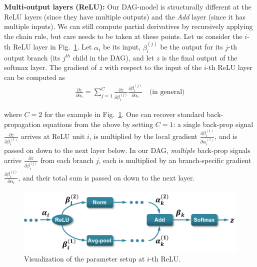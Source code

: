 \documentclass[10pt,twocolumn,letterpaper]{article}
\begin{document}
{\bf Multi-output layers (ReLU):} Our DAG-model is structurally different at the ReLU layers (since they have multiple outputs) and the \textit{Add} layer (since it has multiple inputs). We can still compute partial derivatives by recursively applying the chain rule, but care needs to be taken at these points. Let us consider the $i$-th ReLU layer in Fig.~\ref{fig:backprop_eq}. Let $\alpha_i$ be its input, $\beta_i^{(j)}$ be the output for its $j$-th output branch (its $j^{th}$ child in the DAG), and let $z$ is the final output of the softmax layer. The gradient of $z$ with respect to the input of the $i$-th ReLU layer can be computed as
\vspace{-5}
\begin{align}
\frac{\partial z}{\partial \alpha_i}=\sum_{j=1}^{C}\frac{\partial z}{\partial \beta_i^{(j)}}\frac{\partial \beta_i^{(j)}}{\partial \alpha_i} \quad \text {(in general)} \label{eq:backprop1}
\end{align}

\noindent where $C=2$ for the example in Fig.~\ref{fig:backprop_eq}. One can recover standard back-propagation equations from the above by setting $C=1$: a single back-prop signal $\frac{\partial z}{\partial \beta_i^{(1)}}$  arrives at ReLU unit $i$, is multiplied by the local gradient $\frac{\partial \beta_i^{(1)}}{\partial \alpha_i^{(1)}}$, and is passed on down to the next layer below. In our DAG, {\em multiple} back-prop signals arrive $\frac{\partial z}{\partial \beta_i^{(j)}}$ from each branch $j$, each is multiplied by an branch-specific gradient $\frac{\partial \beta_i^{(j)}}{\partial \alpha_i}$, and their total sum is passed on down to the next layer.


\begin{figure}[t!]
\centering
	\includegraphics[width=.85\columnwidth]{fig/fig_backprop_eq.png}
\caption{Visualization of the parameter setup at $i$-th ReLU.}
\label{fig:backprop_eq}
\end{figure}
\end{document}
